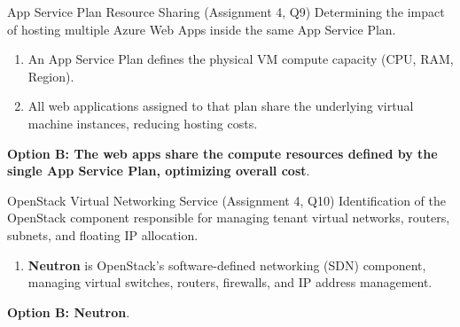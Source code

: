 \begin{solved}{App Service Plan Resource Sharing (Assignment 4, Q9)}
\Given Determining the impact of hosting multiple Azure Web Apps inside the same App Service Plan.
\Steps
\begin{enumerate}[leftmargin=*]
  \item An App Service Plan defines the physical VM compute capacity (CPU, RAM, Region).
  \item All web applications assigned to that plan share the underlying virtual machine instances, reducing hosting costs.
\end{enumerate}
\Answer \textbf{Option B: The web apps share the compute resources defined by the single App Service Plan, optimizing overall cost}.
\end{solved}

\begin{solved}{OpenStack Virtual Networking Service (Assignment 4, Q10)}
\Given Identification of the OpenStack component responsible for managing tenant virtual networks, routers, subnets, and floating IP allocation.
\Steps
\begin{enumerate}[leftmargin=*]
  \item \textbf{Neutron} is OpenStack's software-defined networking (SDN) component, managing virtual switches, routers, firewalls, and IP address management.
\end{enumerate}
\Answer \textbf{Option B: Neutron}.
\end{solved}
